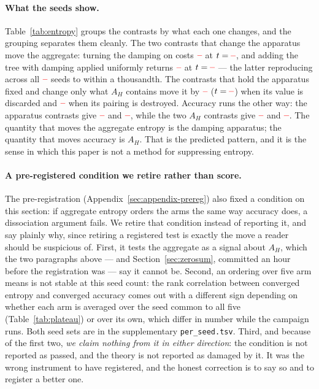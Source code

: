 \documentclass[11pt]{article}
\newcommand{\AH}{A_{H}}
\providecommand{\PENDING}{\textcolor{red}{\textbf{--}}}
\newcommand{\num}[1]{\ifcsname #1\endcsname\csname #1\endcsname\else\PENDING\fi}
\begin{document}
\paragraph{What the seeds show.} Table~\ref{tab:entropy} groups the contrasts by
what each one changes, and the grouping separates them cleanly. The two contrasts
that change the apparatus move the aggregate: turning the damping on costs
$\num{Csteergrpoentropy}$ at $t = \num{Tsteergrpoentropy}$, and adding the tree with
damping applied uniformly returns $\num{Cuniformsteerentropy}$ at
$t = \num{Tuniformsteerentropy}$ --- the latter reproducing across all
$\num{Nseedsused}$ seeds to within a thousandth. The contrasts that hold the
apparatus fixed and change only what $\AH$ contains move it by
$\num{Csigneduniformentropy}$ ($t = \num{Tsigneduniformentropy}$) when its value is
discarded and $\num{Csignedpermutedentropy}$ when its pairing is destroyed. Accuracy
runs the other way: the apparatus contrasts give $\num{Cuniformsteeracc}$ and
$\num{Csteergrpoacc}$, while the two $\AH$ contrasts give $\num{Csigneduniformacc}$
and $\num{Csignedpermutedacc}$. The quantity that moves the aggregate entropy is the
damping apparatus; the quantity that moves accuracy is $\AH$. That is the predicted
pattern, and it is the sense in which this paper is not a method for suppressing
entropy.

\paragraph{A pre-registered condition we retire rather than score.} The
pre-registration (Appendix~\ref{sec:appendix-prereg}) also fixed a condition on this
section: if aggregate entropy orders the arms the same way accuracy does, a
dissociation argument fails. We retire that condition instead of reporting it,
and say plainly why, since retiring a registered test is exactly the move a reader
should be suspicious of. First, it tests the aggregate as a signal about $\AH$,
which the two paragraphs above --- and Section~\ref{sec:zerosum}, committed an hour
before the registration was --- say it cannot be. Second, an ordering over five arm
means is not stable at this seed count: the rank correlation between converged
entropy and converged accuracy comes out with a different sign depending on whether
each arm is averaged over the seed common to all five (Table~\ref{tab:plateau}) or
over its own, which differ in number while the campaign runs. Both seed sets are in
the supplementary \texttt{per\_seed.tsv}. Third, and because of the first two, \emph{we
claim nothing from it in either direction}: the condition is not reported as passed,
and the theory is not reported as damaged by it. It was the wrong instrument to have
registered, and the honest correction is to say so and to register a better one.
\end{document}
